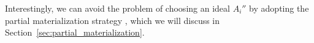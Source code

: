 \documentclass[10pt,journal,compsoc]{IEEEtran}
\begin{document}
Interestingly, we can avoid the problem of choosing an ideal $ A_i'' $ by adopting the partial materialization strategy  \cite{zhao2011graph}, which we will discuss in Section~\ref{sec:partial_materialization}.
%
\end{document}
